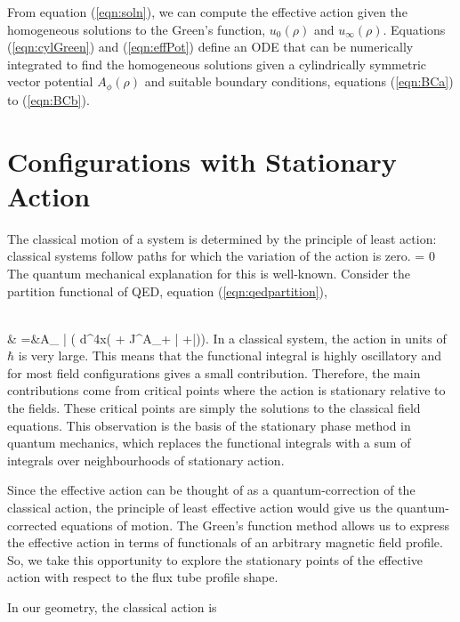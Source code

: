 From equation (\ref{eqn:soln}), we can compute the effective action given the homogeneous solutions 
to the Green's function, $u_0(\rho)$ and $u_\infty(\rho)$.
Equations (\ref{eqn:cylGreen}) and (\ref{eqn:effPot}) define an \ac{ODE} that can be numerically 
integrated to find the homogeneous solutions given a cylindrically symmetric vector potential $A_\phi(\rho)$
and suitable boundary conditions, equations (\ref{eqn:BCa}) to (\ref{eqn:BCb}).

\section{Configurations with Stationary Action}
\label{sec:stationaryEA}

The classical motion of a system is determined by the principle of least action: 
classical systems follow paths for which the variation of the action is zero. 
\be 
\delta \Gamma = 0
\ee 
The quantum 
mechanical explanation for this is well-known. Consider the partition functional 
of \ac{QED}, equation (\ref{eqn:qedpartition}),

\ba
{}\nonumber \\
  & =&\int {}A_\mu {}\psi {} \bar{\psi}
  \exp\left( \int d^4x( + J^\mu A_\mu + \bar{\eta}\psi
  +\bar{\psi}\eta)\right).
  \label{eqn:qedpartition2}
\ea
In a classical system, the action in units of $\hbar$ is very large. This means 
that the functional integral is highly oscillatory and for most field configurations 
gives a small contribution. Therefore, the main contributions come from critical 
points where the action is stationary relative to the fields. These critical points 
are simply the solutions to the classical field equations. This observation is the 
basis of the stationary phase method in quantum mechanics, which replaces the functional 
integrals with a sum of integrals over neighbourhoods of stationary action. 

Since the 
effective action can be thought of as a quantum-correction of the classical action, 
the principle of least effective action would give us the quantum-corrected 
equations of motion. The Green's function method allows us to express the 
effective action in terms of functionals of an arbitrary magnetic field profile.
So, we take this opportunity to explore the stationary points of the 
effective action with respect to the flux tube profile shape.


In our geometry, the classical action is

